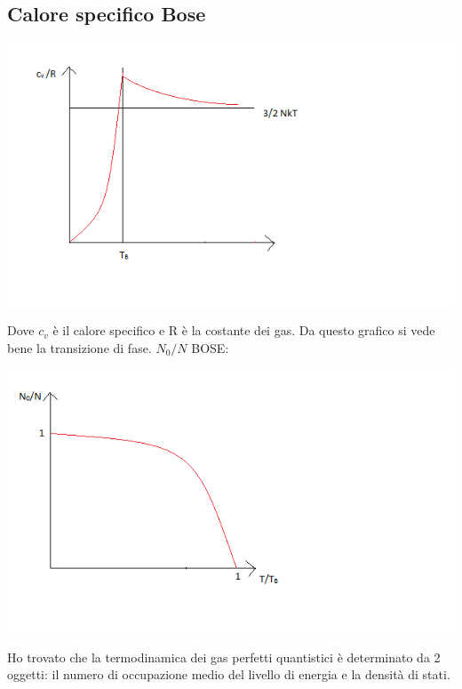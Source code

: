 \subsection{Calore specifico Bose}
\begin{center}
\includegraphics[scale=1]{immagini/calore-spec-bose.png}
\end{center}
Dove $c_{v}$ è il calore specifico e R è la costante dei gas. Da questo grafico si vede bene la transizione di fase. 
$N_{0}/N$ BOSE:
\begin{center}
\includegraphics[scale=1]{immagini/ultimo-graf-bose.png}
\end{center}
Ho trovato che la termodinamica dei gas perfetti quantistici è determinato da 2 oggetti: il numero di occupazione medio del livello di energia e la densità di stati.
%